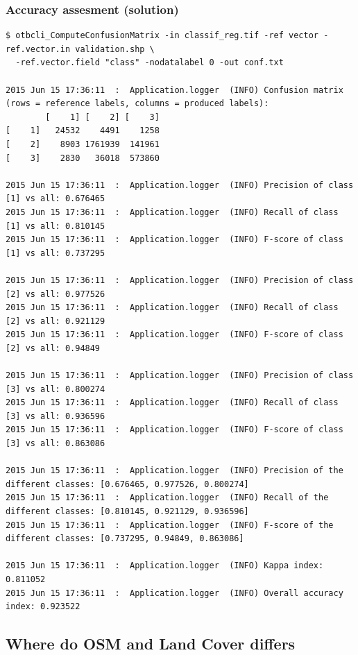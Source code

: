 \documentclass[8pt]{beamer}
\begin{document}
\begin{frame}[fragile]
\frametitle{Accuracy assesment (solution)}
\begin{scriptsize}
\begin{verbatim}
$ otbcli_ComputeConfusionMatrix -in classif_reg.tif -ref vector -ref.vector.in validation.shp \
  -ref.vector.field "class" -nodatalabel 0 -out conf.txt

2015 Jun 15 17:36:11  :  Application.logger  (INFO) Confusion matrix (rows = reference labels, columns = produced labels):
        [    1] [    2] [    3] 
[    1]   24532    4491    1258 
[    2]    8903 1761939  141961 
[    3]    2830   36018  573860 

2015 Jun 15 17:36:11  :  Application.logger  (INFO) Precision of class [1] vs all: 0.676465
2015 Jun 15 17:36:11  :  Application.logger  (INFO) Recall of class [1] vs all: 0.810145
2015 Jun 15 17:36:11  :  Application.logger  (INFO) F-score of class [1] vs all: 0.737295

2015 Jun 15 17:36:11  :  Application.logger  (INFO) Precision of class [2] vs all: 0.977526
2015 Jun 15 17:36:11  :  Application.logger  (INFO) Recall of class [2] vs all: 0.921129
2015 Jun 15 17:36:11  :  Application.logger  (INFO) F-score of class [2] vs all: 0.94849

2015 Jun 15 17:36:11  :  Application.logger  (INFO) Precision of class [3] vs all: 0.800274
2015 Jun 15 17:36:11  :  Application.logger  (INFO) Recall of class [3] vs all: 0.936596
2015 Jun 15 17:36:11  :  Application.logger  (INFO) F-score of class [3] vs all: 0.863086

2015 Jun 15 17:36:11  :  Application.logger  (INFO) Precision of the different classes: [0.676465, 0.977526, 0.800274]
2015 Jun 15 17:36:11  :  Application.logger  (INFO) Recall of the different classes: [0.810145, 0.921129, 0.936596]
2015 Jun 15 17:36:11  :  Application.logger  (INFO) F-score of the different classes: [0.737295, 0.94849, 0.863086]

2015 Jun 15 17:36:11  :  Application.logger  (INFO) Kappa index: 0.811052
2015 Jun 15 17:36:11  :  Application.logger  (INFO) Overall accuracy index: 0.923522

\end{verbatim}
\end{scriptsize}

\end{frame}

\subsection{Where do OSM and Land Cover differs}
\end{document}

